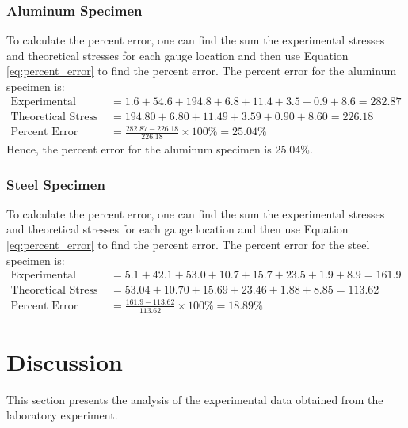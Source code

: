 \documentclass[12pt, titlepage]{article}
\begin{document}
\subsubsection{Aluminum Specimen}
To calculate the percent error, one can find the sum the experimental stresses
and theoretical stresses for each gauge location and then use Equation
\ref{eq:percent_error} to find the percent error. The percent error for the
aluminum specimen is:
\begin{equation}
    \begin{split}
      \text{Experimental Stress} &= 1.6 + 54.6 + 194.8 + 6.8 + 11.4 + 3.5 + 0.9 + 8.6 = 282.87 \\[10pt]
      \text{Theoretical Stress} &= 194.80 + 6.80 + 11.49 + 3.59 + 0.90 + 8.60 = 226.18 \\[10pt]
      \text{Percent Error} &= \frac{282.87 - 226.18}{226.18} \times 100\% = 25.04\%
      \label{eq:alu_percent_error}
    \end{split}
  \end{equation}
Hence, the percent error for the aluminum specimen is 25.04\%.
\subsubsection{Steel Specimen}
To calculate the percent error, one can find the sum the experimental stresses
and theoretical stresses for each gauge location and then use Equation
\ref{eq:percent_error} to find the percent error. The percent error for the
steel specimen is:
\begin{equation}
    \begin{split}
      \text{Experimental Stress} &= 5.1 + 42.1 + 53.0 + 10.7 + 15.7 + 23.5 + 1.9 + 8.9 = 161.9 \\[10pt]
      \text{Theoretical Stress} &= 53.04 + 10.70 + 15.69 + 23.46 + 1.88 + 8.85 = 113.62 \\[10pt]
      \text{Percent Error} &= \frac{161.9 - 113.62}{113.62} \times 100\% = 18.89\%
      \label{eq:steel_percent_error}
    \end{split}
  \end{equation}
\newpage
\section{Discussion}
This section presents the analysis of the experimental data obtained from the
laboratory experiment.
\end{document}
